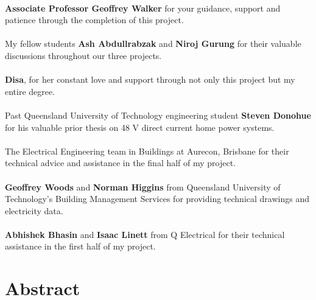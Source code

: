 \paragraph{}
\textbf{Associate Professor Geoffrey Walker} for your guidance, support and patience through the completion of this project. 

\paragraph{}
My fellow students \textbf{Ash Abdullrabzak} and \textbf{Niroj Gurung} for their valuable discussions throughout our three projects. 

\paragraph{}
\textbf{Disa}, for her constant love and support through not only this project but my entire degree.    

\paragraph{}
Past Queensland University of Technology engineering student \textbf{Steven Donohue} for his valuable prior thesis on 48 V direct current home power systems.  

\paragraph{}
The Electrical Engineering team in Buildings at Aurecon, Brisbane for their technical advice and assistance in the final half of my project.  

\paragraph{}
\textbf{Geoffrey Woods} and \textbf{Norman Higgins} from Queensland University of Technology's Building Management Services for providing technical drawings and electricity data.

\paragraph{}
\textbf{Abhishek Bhasin} and \textbf{Isaac Linett} from Q Electrical for their technical assistance in the first half of my project.



\newpage


\section*{Abstract}

